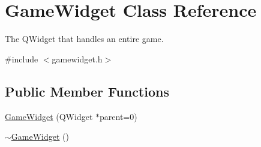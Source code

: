 \hypertarget{classGameWidget}{
\section{GameWidget Class Reference}
\label{classGameWidget}
}


The QWidget that handles an entire game.  




{\ttfamily \#include $<$gamewidget.h$>$}

\subsection*{Public Member Functions}
\begin{DoxyCompactItemize}
\item 
\hyperlink{classGameWidget_af02a124557d71b9a4b7388c452cb540b}{GameWidget} (QWidget $\ast$parent=0)
\item 
\hyperlink{classGameWidget_ae627172579cbf8d912e035a1844ffd59}{$\sim$GameWidget} ()
\end{DoxyCompactItemize}
